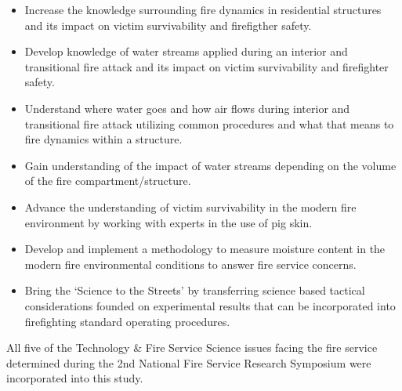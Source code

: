 \documentclass[12pt,oneside]{book}
\begin{document}
\begin{itemize}
	\item Increase the knowledge surrounding fire dynamics in residential structures and its impact on victim survivability and firefigther safety.
	\item Develop knowledge of water streams applied during an interior and transitional fire attack and its impact on  victim survivability and firefighter safety.
	\item Understand where water goes and how air flows during interior and transitional fire attack utilizing common procedures and what that means to fire dynamics within a structure.
	\item Gain understanding of the impact of water streams depending on the volume of the fire compartment/structure.
	\item Advance the understanding of victim survivability in the modern fire environment by working with experts in the use of pig skin.
	\item Develop and implement a methodology to measure moisture content in the modern fire environmental conditions to answer fire service concerns.
	\item Bring the `Science to the Streets' by transferring science based tactical considerations founded on experimental results that can be incorporated into firefighting standard operating procedures.
	\end{itemize}

All five of the Technology \& Fire Service Science issues facing the fire service determined during the 2nd National Fire Service Research Symposium \cite{NFFF} were incorporated into this study.

\clearpage




\end{document}
